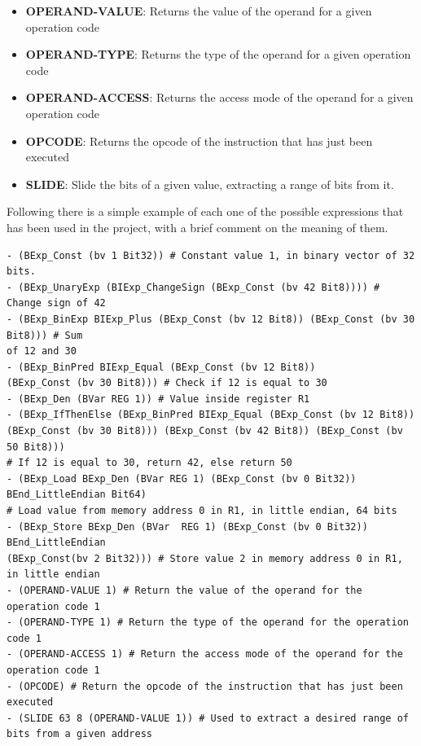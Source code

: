 \begin{itemize}
  \item \textbf{OPERAND-VALUE}: Returns the value of the operand for a given operation
    code

  \item \textbf{OPERAND-TYPE}: Returns the type of the operand for a given operation
    code

  \item \textbf{OPERAND-ACCESS}: Returns the access mode of the operand for a given
    operation code

  \item \textbf{OPCODE}: Returns the opcode of the instruction that has just been
    executed

  \item \textbf{SLIDE}: Slide the bits of a given value, extracting a range of
    bits from it.
\end{itemize}

Following there is a simple example of each one of the possible expressions that
has been used in the project, with a brief comment on the meaning of them. \begin{verbatim}
- (BExp_Const (bv 1 Bit32)) # Constant value 1, in binary vector of 32 bits.
- (BExp_UnaryExp (BIExp_ChangeSign (BExp_Const (bv 42 Bit8)))) # Change sign of 42
- (BExp_BinExp BIExp_Plus (BExp_Const (bv 12 Bit8)) (BExp_Const (bv 30 Bit8))) # Sum
of 12 and 30
- (BExp_BinPred BIExp_Equal (BExp_Const (bv 12 Bit8)) 
(BExp_Const (bv 30 Bit8))) # Check if 12 is equal to 30
- (BExp_Den (BVar REG 1)) # Value inside register R1
- (BExp_IfThenElse (BExp_BinPred BIExp_Equal (BExp_Const (bv 12 Bit8)) 
(BExp_Const (bv 30 Bit8))) (BExp_Const (bv 42 Bit8)) (BExp_Const (bv 50 Bit8))) 
# If 12 is equal to 30, return 42, else return 50
- (BExp_Load BExp_Den (BVar REG 1) (BExp_Const (bv 0 Bit32)) BEnd_LittleEndian Bit64) 
# Load value from memory address 0 in R1, in little endian, 64 bits
- (BExp_Store BExp_Den (BVar  REG 1) (BExp_Const (bv 0 Bit32)) BEnd_LittleEndian 
(BExp_Const(bv 2 Bit32))) # Store value 2 in memory address 0 in R1, in little endian
- (OPERAND-VALUE 1) # Return the value of the operand for the operation code 1
- (OPERAND-TYPE 1) # Return the type of the operand for the operation code 1
- (OPERAND-ACCESS 1) # Return the access mode of the operand for the operation code 1
- (OPCODE) # Return the opcode of the instruction that has just been executed
- (SLIDE 63 8 (OPERAND-VALUE 1)) # Used to extract a desired range of bits from a given address
\end{verbatim}

